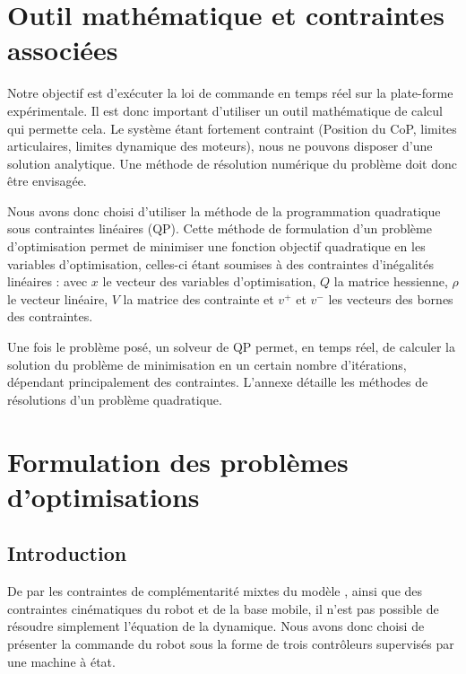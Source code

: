 	\section{Outil mathématique et contraintes associées}
	
		Notre objectif est d'exécuter la loi de commande en temps réel sur la plate-forme expérimentale. 
		Il est donc important d'utiliser un outil mathématique de calcul qui permette cela.
		Le système étant fortement contraint (Position du CoP, limites articulaires, limites dynamique des moteurs), nous ne pouvons disposer d'une solution analytique.
		Une méthode de résolution numérique du problème doit donc être envisagée.
		
		Nous avons donc choisi d'utiliser la méthode de la programmation quadratique sous contraintes linéaires (QP).
		Cette méthode de formulation d'un problème d'optimisation permet de minimiser une fonction objectif quadratique en les variables d'optimisation, celles-ci étant soumises à des contraintes d'inégalités linéaires :
		avec $x$ le vecteur des variables d'optimisation, $Q$ la matrice hessienne, $\rho$ le vecteur linéaire, $V$ la matrice des contrainte et $v^+$ et $v^-$ les vecteurs des bornes des contraintes.
		
		Une fois le problème posé, un solveur de QP permet, en temps réel, de calculer la solution du problème de minimisation en un certain nombre d'itérations, dépendant principalement des contraintes.
		L’annexe  détaille les méthodes de résolutions d'un problème quadratique.


	\section{Formulation des problèmes d'optimisations}
		\subsection{Introduction}
		
 			De par les contraintes de complémentarité mixtes du modèle , ainsi que des contraintes cinématiques du robot et de la base mobile, il n'est pas possible de résoudre simplement l'équation de la dynamique.
 			Nous avons donc choisi de présenter la commande du robot sous la forme de trois contrôleurs supervisés par une machine à état.
 			
